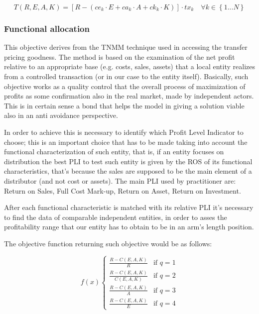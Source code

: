 \begin{doublespace}
\begin{equation}
T(R,E,A,K)= [R-(ce_k\cdot E+ca_k\cdot A+ck_k\cdot K)]\cdot tx_k \quad \forall k \in \left\{1...N\right\}
\end{equation}

\subsubsection{Functional allocation}
This objective derives from the TNMM technique used in accessing the transfer pricing goodness. The method is based on the examination of the net profit relative to an appropriate base (e.g. costs, sales, assets) that a local entity realizes from a controlled transaction (or in our case to the entity itself). Basically, such objective works as a quality control that the overall process of maximization of profits as some confirmation also in the real market, made by independent actors. This is in certain sense a bond that helps the model in giving a solution viable also in an anti avoidance perspective.

In order to achieve this is necessary to identify which Profit Level Indicator to choose; this is an important choice that has to be made taking into account the functional characterization of such entity, that is, if an entity focuses on distribution the best PLI to test such entity is given by the ROS of its functional characteristics, that's because the sales are supposed to be the main element of a distributor (and not cost or assets). The main PLI used by practitioner are: Return on Sales, Full Cost Mark-up, Return on Asset, Return on Investment.

After each functional characteristic is matched with its relative PLI it's necessary to find the data of comparable independent entities, in order to asses the profitability range that our entity has to obtain to be in an arm's length position.

The objective function returning such objective would be as follows:

\begin{equation}
f(x) 
\begin{cases}
   \frac{R - C(E,A,K)}{R} & \text{if } q=1
   \\
   \frac{R - C(E,A,K)}{C(E,A,K)} & \text{if } q=2
   \\
   \frac{R - C(E,A,K)}{A} & \text{if } q=3
   \\
   \frac{R - C(E,A,K)}{E} & \text{if } q=4
\end{cases}
\end{equation}


\end{doublespace}

